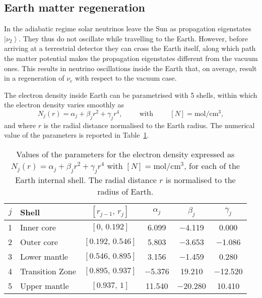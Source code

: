 \documentclass{article}
\newcommand{\cm}[0]{\text{cm}}
\newcommand{\ket}[1]{\left| #1 \right>}
\begin{document}
\subsection{Earth matter regeneration}
In the adiabatic regime solar neutrinos leave the Sun as propagation eigenstates $\ket{\nu_2}$. They thus do not oscillate while travelling to the Earth. However, before arriving at a terrestrial detector they can cross the Earth itself, along which path the matter potential makes the propagation eigenstates different from the vacuum ones. This results in neutrino oscillations inside the Earth that, on average, result in a regeneration of $\nu_e$ with respect to the vacuum case.

The electron density inside Earth can be parametrised with 5 shells, within which the electron density varies smoothly as~\cite{Lisi:1997yc}
\begin{equation}\label{eq:earth_density_param}
	N_j(r) = \alpha_j + \beta_j r^2 + \gamma_j r^4, \hspace{1cm} \text{with} \hspace{1cm} \left[N\right] = \text{mol}/\cm^3,
\end{equation}
and where $r$ is the radial distance normalised to the Earth radius. The numerical value of the parameters is reported in Table~\ref{tab:shell_parameters}.

\begin{table}[ht]
\begin{tabular}{clcccc}
\hline
\hline
$j$& Shell          & $[r_{j-1},\,r_j]$  &$\alpha_j$ &$\beta_j$ &$\gamma_j$\\
\hline
1 & Inner core      &     $[0,\,0.192]$    &   6.099 & $-$4.119 &    0.000 \\
2 & Outer core      &   $[0.192,\,0.546]$  &   5.803 & $-$3.653 & $-$1.086 \\
3 & Lower mantle    &   $[0.546,\,0.895]$  &   3.156 & $-$1.459 &    0.280 \\
4 & Transition Zone &   $[0.895,\,0.937]$  &$-$5.376 &   19.210 &$-$12.520 \\
5 & Upper mantle    &     $[0.937,\,1]$    &  11.540 &$-$20.280 &   10.410 \\
\hline 
\hline
\end{tabular}
\caption{\label{tab:shell_parameters}Values of the parameters for the electron density expressed as $N_j(r) = \alpha_j + \beta_j r^2 + \gamma_j r^4$ with $[N] = \text{mol}/\cm^3$, for each of the Earth internal shell. The radial distance $r$ is normalised to the radius of Earth.}
\end{table}
\end{document}
